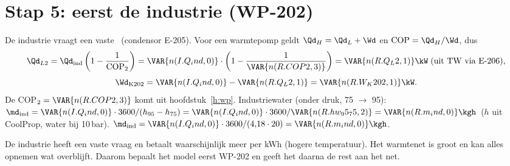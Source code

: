 \section{Stap 5: eerst de industrie (WP-202)}
De industrie vraagt een vaste \kW\ (condensor E-205). Voor een warmtepomp geldt
$\Qd_H = \Qd_L + \Wd$ en $\mathrm{COP} = \Qd_H/\Wd$, dus
\[
\Qd_{L2} = \Qd_\mathrm{ind}\left(1-\frac{1}{\mathrm{COP}_2}\right)
= \VAR{n(I.Q_ind,0)}\cdot\left(1 - \frac{1}{\VAR{n(R.COP2,3)}}\right) = \VAR{n(R.Q_L2,1)}\kW \;(\text{uit TW via E-206}),
\]
\[
\Wd_\mathrm{K202} = \VAR{n(I.Q_ind,0)} - \VAR{n(R.Q_L2,1)} = \VAR{n(R.W_K202,1)}\kW .
\]
De COP$_2 = \VAR{n(R.COP2,3)}$ komt uit hoofdstuk~\ref{h:wp}. Industriewater (onder druk, 75 $\rightarrow$ 95\degC):
$\md_\mathrm{ind} = \VAR{n(I.Q_ind,0)}\cdot3600/(h_{95}-h_{75}) = \VAR{n(I.Q_ind,0)}\cdot3600/\VAR{n(R.hw_95_75,2)} = \VAR{n(R.m_ind,0)}\kgh$
($h$ uit CoolProp, water bij 10\,bar).
$\md_\mathrm{ind} = \VAR{n(I.Q_ind,0)}\cdot3600/(4{,}18\cdot20) = \VAR{n(R.m_ind,0)}\kgh$.
\begin{waarom}
De industrie heeft een vaste vraag en betaalt waarschijnlijk meer per kWh (hogere temperatuur). Het warmtenet is
groot en kan alles opnemen wat overblijft. Daarom bepaalt het model eerst WP-202 en geeft het daarna de rest aan het net.
\end{waarom}

